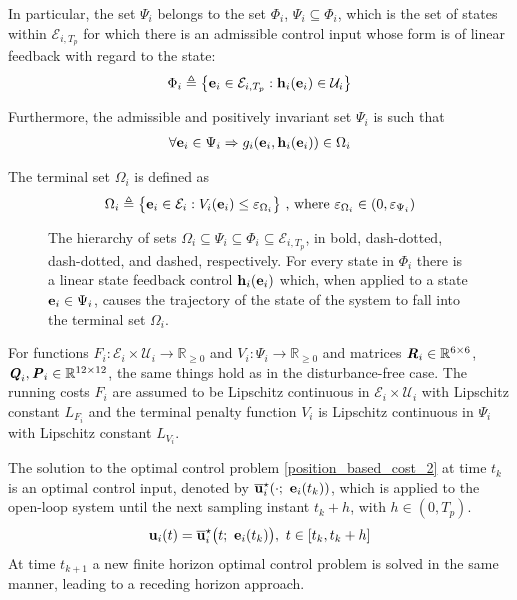 In particular, the set $\Psi_i$ belongs to the set
$\Phi_i$, $\Psi_i \subseteq \Phi_i$, which is the set of states within
$\mathcal{E}_{i,T_p}$ for which there is an admissible control input whose form
is of linear feedback with regard to the state:
\begin{align}
  \Phi_i \triangleq \big\{\bm{\mathbf{e}}_i \in \mathcal{E}_{i,T_p} : \bm{\mathbf{h}}_i(\bm{\mathbf{e}}_i) \in \mathcal{U}_i \big\}
\end{align}

Furthermore, the admissible and positively invariant set $\Psi_i$ is such that
\begin{align}
\forall \bm{\mathbf{e}}_i \in \Psi_i \Rightarrow g_i(\bm{\mathbf{e}}_i, \bm{\mathbf{h}}_i(\bm{\mathbf{e}}_i)) \in \Omega_i
\end{align}

The terminal set $\Omega_i$ is defined as
\begin{align}
  \Omega_i \triangleq \big\{\bm{\mathbf{e}}_i \in \mathcal{E}_i : V_i(\bm{\mathbf{e}}_i)
    \leq \varepsilon_{\Omega_i}\big\}\ \text{, where } \varepsilon_{\Omega_i} \in (0, \varepsilon_{\Psi_i})
\end{align}


\begin{figure}[ht!]
  \centering
  
  \caption{The hierarchy of sets
  $\Omega_i \subseteq \Psi_i \subseteq \Phi_i \subseteq \mathcal{E}_{i,T_p}$,
  in bold, dash-dotted, dash-dotted, and dashed, respectively.
  For every state in $\Phi_i$ there is a linear state feedback control
  $\bm{\mathbf{h}}_i(\bm{\mathbf{e}}_i)$ which, when applied to a state
  $\bm{\mathbf{e}}_i \in \Psi_i$, causes the trajectory of the state of the system to
  fall into the terminal set $\Omega_i$.}
\end{figure}


For functions
$F_i : \mathcal{E}_i \times \mathcal{U}_i \to \mathbb{R}_{\geq 0}$ and
$V_i: \Psi_i \to \mathbb{R}_{\geq 0}$ and matrices
$\bm{\mathit{R}}_i \in \mathbb{R}^{6 \times 6}$,
$\bm{\mathit{Q}}_i, \bm{\mathit{P}}_i \in \mathbb{R}^{12 \times 12}$, the same things hold
as in the disturbance-free case. The running costs $F_i$ are assumed to be
Lipschitz continuous in $\mathcal{E}_i \times \mathcal{U}_i$ with Lipschitz
constant $L_{F_i}$ and the terminal penalty function $V_i$ is Lipschitz
continuous in $\Psi_i$ with Lipschitz constant $L_{V_i}.$


The solution to the optimal control problem \eqref{position_based_cost_2}
at time $t_k$ is an optimal control input, denoted by
$\overline{\bm{\mathbf{u}}}_i^{\star}(\cdot;\ \bm{\mathbf{e}}_i(t_k))$, which
is applied to the open-loop system until the next sampling instant $t_k + h$,
with $h \in (0,T_p)$.
\begin{align}
  \bm{\mathbf{u}}_i(t) = \overline{\bm{\mathbf{u}}}_i^{\star}\big(t;\ \bm{\mathbf{e}}_i(t_k)\big),\  t \in [t_k, t_k + h]
 \label{eq:position_based_optimal_u_2}
\end{align}
At time $t_{k+1}$ a new finite horizon optimal control problem is solved in the
same manner, leading to a receding horizon approach.

